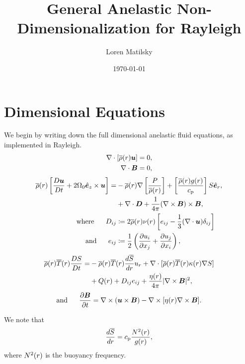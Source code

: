 \documentclass[12pt]{article}
\date{\today}
\author{Loren Matilsky}
\title{General Anelastic Non-Dimensionalization for Rayleigh}
\numberwithin{equation}{section}
\begin{document}
	\maketitle
	\section{Dimensional Equations}
	We begin by writing down the full dimensional anelastic fluid equations, as implemented in Rayleigh.
	\begin{align}
		\nabla\cdot[\overline{\rho}(r)\bm{u}] &= 0\label{eq:contdim},\\
		\nabla\cdot \bm{B} &= 0,
	\end{align}
	\begin{subequations}\label{eq:momdim}
	\begin{align}
		\overline{\rho}(r)\left[\frac{D\bm{u}}{Dt}+2\Omega_0\hat{\bm{e}}_z\times\bm{u}\right] = &-\overline{\rho}(r)\nabla\left[ \frac{P}{\overline{\rho}(r)} \right] + \left[\frac{\overline{\rho}(r) g(r)}{c_{\rm{p}}}\right] S\hat{\bm{e}}_r, \nonumber\\
		&+\nabla\cdot\bm{D} + \frac{1}{4\pi}(\nabla\times\bm{B})\times\bm{B},\\
		\text{where}\ \ \ \ \  D_{ij} &\coloneqq 2\overline{\rho}(r)\nu(r) \left[e_{ij} - \frac{1}{3}(\nabla\cdot\bm{u}) \delta_{ij} \right]\\
		\text{and}\ \ \ \ \  e_{ij} &\coloneqq \frac{1}{2}\left(\frac{\partial u_i}{\partial x_j} + \frac{\partial u_j}{\partial x_i} \right),
	\end{align}
	\end{subequations}
	\begin{align}\label{eq:endim}
		\overline{\rho}(r)\overline{T}(r) \frac{DS}{Dt} = &- \overline{\rho}(r)\overline{T}(r) \frac{d\overline{S}}{dr} u_r + \nabla\cdot[\overline{\rho}(r) \overline{T}(r) \kappa(r) \nabla S] \nonumber \\
		&+ Q(r) + D_{ij}e_{ij} + \frac{\eta(r)}{4\pi}|\nabla\times\bm{B}|^2,
	\end{align}
	\begin{align}\label{eq:inddim}
	\text{and}\ \ \ \ \  \frac{\partial\bm{B}}{\partial t} = \nabla\times(\bm{u}\times\bm{B}) - \nabla\times[\eta(r)\nabla\times\bm{B}].
	\end{align}

	We note that
	\begin{align}
		\frac{d\overline{S}}{dr} = c_{\rm{p}} \frac{N^2(r)}{g(r)},
	\end{align}
	where $N^2(r)$ is the buoyancy frequency. 
	
\end{document}
